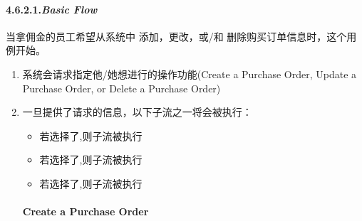 \documentclass{article}
\begin{document}
\paragraph{4.6.2.1.\hspace*{0.5em}\emph{Basic Flow}}\label{sec--basic-flow-}%

\noindent{}\mdbr
{}当拿佣金的员工希望从系统中 添加，更改，或/和 删除购买订单信息时，这个用例开始。%

\begin{enumerate}%

\item{}
系统会请求指定他/她想进行的操作功能(Create a Purchase Order,
Update a Purchase Order, or Delete a Purchase Order)%

\item{}
一旦提供了请求的信息，以下子流之一将会被执行：%

\begin{itemize}[noitemsep,topsep=\mdcompacttopsep]%

\item{}若选择了,则子流被执行%

\item{}若选择了,则子流被执行%

\item{}若选择了,则子流被执行%
\end{itemize}%

\paragraph{Create a Purchase Order}\label{sec-create-a-purchase-order}%


\end{enumerate}
\end{document}
